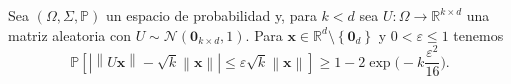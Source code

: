\begin{theorem}\label{thm:projection}
	Sea $\left(\Omega,\Sigma,\mathbb{P}\right)$ un espacio de
	probabilidad y, para $k<d$ sea
	$U\colon\Omega\to\mathbb{R}^{k\times d}$ una matriz aleatoria con
	$U\sim\mathcal{N}\left(\symbf{0}_{k\times d},1\right)$.
	Para
	$\symbf{x}\in\mathbb{R}^{d}\setminus\left\{\symbf{0}_{d}\right\}$ y
	$0<\varepsilon\leq 1$ tenemos
	\begin{equation*}
		\mathbb{P}
		\left[
			\left|
			\left\|
			U\symbf{x}
			\right\|-
			\sqrt{k}
			\left\|
			\symbf{x}
			\right\|
			\right|\leq
			\varepsilon\sqrt{k}
			\left\|
			\symbf{x}
			\right\|
			\right]\geq
		1-2\exp
		\Big(-k\frac{\varepsilon^{2}}{16}\Big).
	\end{equation*}
\end{theorem}

